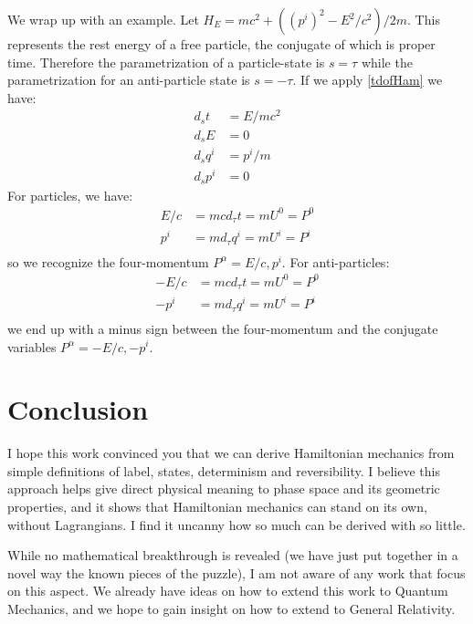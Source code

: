\documentclass[twocolumn,floatfix,nofootinbib]{revtex4}   %
\theoremstyle{theorem}
\theoremstyle{definition}
\begin{document}
We wrap up with an example. Let $H_{E}= mc^2 + ((p^i)^2 - E^2/c^2) / 2m$. This represents the rest energy of a free particle, the conjugate of which is proper time. Therefore the parametrization of a particle-state is $s=\tau$ while the parametrization for an anti-particle state is $s=-\tau$. If we apply \ref{tdofHam} we have:
\begin{align*}
d_{s}t &= E / mc^2 \\
d_{s}E &= 0 \\
d_{s}q^i &= p^i / m \\
d_{s}p^i &= 0
\end{align*}
For particles, we have:
\begin{align*}
E / c &= m c d_{\tau}t = m U^0 = P^0 \\
p^i &= m d_{\tau}q^i = m U^i = P^i \\
\end{align*}
so we recognize the four-momentum $P^\alpha = {E/c, p^i}$. For anti-particles:
\begin{align*}
- E / c &= m c d_{\tau}t = m U^0 = P^0 \\
- p^i &= m d_{\tau}q^i = m U^i = P^i \\
\end{align*}
we end up with a minus sign between the four-momentum and the conjugate variables $P^\alpha = {-E/c, -p^i}$. 

\section{Conclusion}
I hope this work convinced you that we can derive Hamiltonian mechanics from simple definitions of label, states, determinism and reversibility. I believe this approach helps give direct physical meaning to phase space and its geometric properties, and it shows that Hamiltonian mechanics can stand on its own, without Lagrangians. I find it uncanny how so much can be derived with so little.

While no mathematical breakthrough is revealed (we have just put together in a novel way the known pieces of the puzzle), I am not aware of any work that focus on this aspect. We already have ideas on how to extend this work to Quantum Mechanics, and we hope to gain insight on how to extend to General Relativity.
\end{document}
